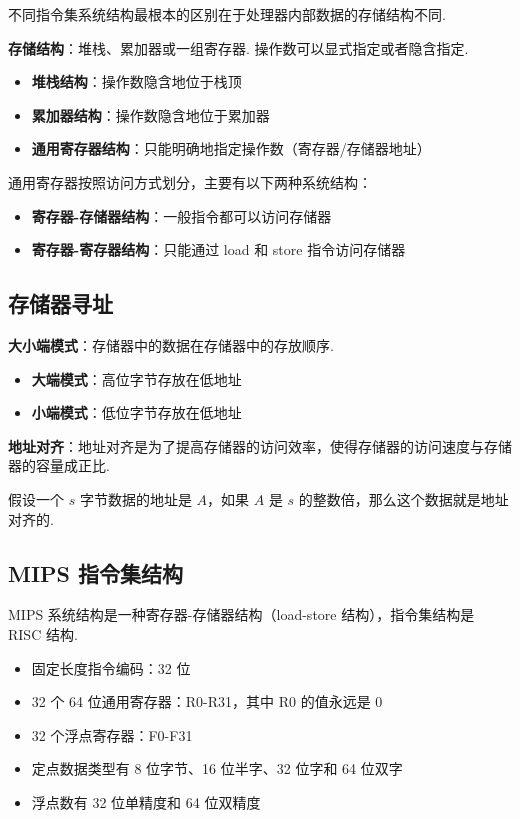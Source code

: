 \documentclass[cn, hazy, blue, normal, 12pt]{elegantnote}
\begin{document}
不同指令集系统结构最根本的区别在于处理器内部数据的存储结构不同.

\textbf{存储结构}：堆栈、累加器或一组寄存器. 操作数可以显式指定或者隐含指定.

\begin{itemize}
    \item \textbf{堆栈结构}：操作数隐含地位于栈顶
    \item \textbf{累加器结构}：操作数隐含地位于累加器
    \item \textbf{通用寄存器结构}：只能明确地指定操作数（寄存器/存储器地址）
\end{itemize}

通用寄存器按照访问方式划分，主要有以下两种系统结构：

\begin{itemize}
    \item \textbf{寄存器-存储器结构}：一般指令都可以访问存储器
    \item \textbf{寄存器-寄存器结构}：只能通过 load 和 store 指令访问存储器
\end{itemize}

\subsection{存储器寻址}

\textbf{大小端模式}：存储器中的数据在存储器中的存放顺序.

\begin{itemize}
    \item \textbf{大端模式}：高位字节存放在低地址
    \item \textbf{小端模式}：低位字节存放在低地址
\end{itemize}

\textbf{地址对齐}：地址对齐是为了提高存储器的访问效率，使得存储器的访问速度与存储器的容量成正比.

假设一个 $s$ 字节数据的地址是 $A$，如果 $A$ 是 $s$ 的整数倍，那么这个数据就是地址对齐的.

\subsection{MIPS 指令集结构}

MIPS 系统结构是一种寄存器-存储器结构（load-store 结构），指令集结构是 RISC 结构.

\begin{itemize}
    \item 固定长度指令编码：32 位
    \item 32 个 64 位通用寄存器：R0-R31，其中 R0 的值永远是 0
    \item 32 个浮点寄存器：F0-F31
    \item 定点数据类型有 8 位字节、16 位半字、32 位字和 64 位双字
    \item 浮点数有 32 位单精度和 64 位双精度
\end{itemize}
\end{document}
